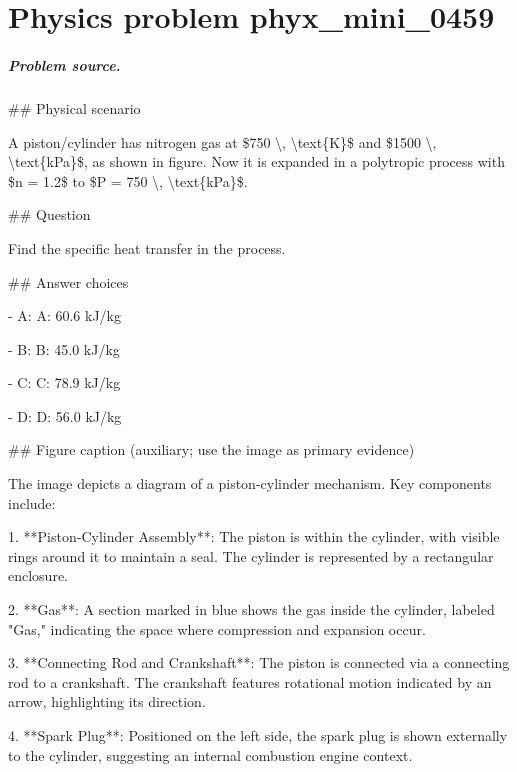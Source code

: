 
\chapter{Physics problem phyx\_mini\_0459}
\label{ch:PhyXMiniProblems_problem_phyx_mini_0459}

\paragraph{Problem source.}
\#\# Physical scenario

A piston/cylinder has nitrogen gas at \$750 \textbackslash{}, \textbackslash{}text\{K\}\$ and \$1500 \textbackslash{}, \textbackslash{}text\{kPa\}\$, as shown in figure. Now it is expanded in a polytropic process with \$n = 1.2\$ to \$P = 750 \textbackslash{}, \textbackslash{}text\{kPa\}\$.

\#\# Question

Find the specific heat transfer in the process.

\#\# Answer choices

- A: A: 60.6 kJ/kg

- B: B: 45.0 kJ/kg

- C: C: 78.9 kJ/kg

- D: D: 56.0 kJ/kg

\#\# Figure caption (auxiliary; use the image as primary evidence)

The image depicts a diagram of a piston-cylinder mechanism. Key components include:

1. **Piston-Cylinder Assembly**: The piston is within the cylinder, with visible rings around it to maintain a seal. The cylinder is represented by a rectangular enclosure.

2. **Gas**: A section marked in blue shows the gas inside the cylinder, labeled "Gas," indicating the space where compression and expansion occur.

3. **Connecting Rod and Crankshaft**: The piston is connected via a connecting rod to a crankshaft. The crankshaft features rotational motion indicated by an arrow, highlighting its direction.

4. **Spark Plug**: Positioned on the left side, the spark plug is shown externally to the cylinder, suggesting an internal combustion engine context.

